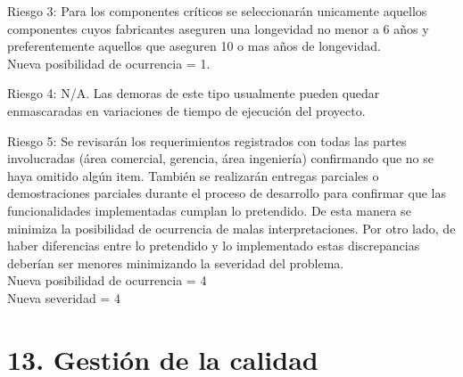\documentclass[11pt]{charter}
\begin{document}
Riesgo 3: Para los componentes críticos se seleccionarán unicamente aquellos componentes cuyos fabricantes aseguren una longevidad no menor a 6 años y preferentemente aquellos que aseguren 10 o mas años de longevidad.\\
Nueva posibilidad de ocurrencia = 1. 

Riesgo 4: N/A. Las demoras de este tipo usualmente pueden quedar enmascaradas en variaciones de tiempo de ejecución del proyecto.

Riesgo 5: Se revisarán los requerimientos registrados con todas las partes involucradas (área comercial, gerencia, área ingeniería) confirmando que no se haya omitido algún item. También se realizarán entregas parciales o demostraciones parciales durante el proceso de desarrollo para confirmar que las funcionalidades implementadas cumplan lo pretendido. De esta manera se minimiza la posibilidad de ocurrencia de malas interpretaciones. Por otro lado, de haber diferencias entre lo pretendido y lo implementado estas discrepancias deberían ser menores minimizando la severidad del problema.\\
Nueva posibilidad de ocurrencia = 4\\
Nueva severidad = 4


\section{13. Gestión de la calidad}
\label{sec:calidad}

%
%
%
%
%
%
\end{document}
